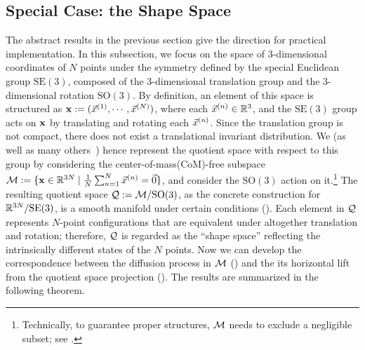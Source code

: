 \documentclass{article} %
\newcommand{\SE}{\mathrm{SE}}
\newcommand{\SO}{\mathrm{SO}}
\begin{document}
\subsection{Special Case: the Shape Space} \label{sec:se3-case}
The abstract results in the previous section give the direction for practical implementation. In this subsection, we focus on the space of 3-dimensional coordinates of $N$ points under the symmetry defined by the special Euclidean group $\SE(3)$, composed of the 3-dimensional translation group and the 3-dimensional rotation $\SO(3)$.
By definition, an element of this space is structured as $\mathbf{x} := (\vec{x}^{(1)}, \cdots, \vec{x}^{(N)})$, where each $\vec{x}^{(n)} \in \mathbb{R}^3$, and the $\SE(3)$ group acts on $\mathbf{x}$ by translating and rotating each $\vec{x}^{(n)}$.
Since the translation group is not compact, there does not exist a translational invariant distribution.
We (as well as many others~\citep{yim2023se,lin2024equivariant}) hence represent the quotient space with respect to this group by considering the center-of-mass(CoM)-free subspace $\mathcal{M}:=\{\mathbf{x}\in\mathbb{R}^{3N} \mid \frac{1}{N} \sum_{n=1}^N \vec{x}^{(n)}=\vec{0}\}$, and consider the $\SO(3)$ action on it.\footnote{Technically, to guarantee proper structures, $\mathcal{M}$ needs to exclude a negligible subset; see .}
The resulting quotient space $\clQ:=\clM/\SO(3)$, as the concrete construction for $\bbR^{3N}/\SE(3)$, is a smooth manifold under certain conditions ().
Each element in $\mathcal{Q}$ represents $N$-point configurations that are equivalent under altogether translation and rotation; therefore, $\mathcal{Q}$ is regarded as the ``shape space'' reflecting the intrinsically different states of the $N$ points.
Now we can develop the correspondence between the diffusion process in $\mathcal{M}$ () and the its horizontal lift from the quotient space projection (). The results are summarized in the following theorem.
\end{document}
